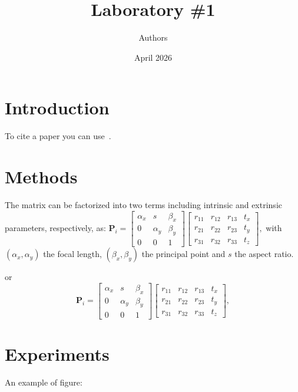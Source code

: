 \documentclass{article}
\title{Laboratory \#1}
\author{Authors}
\date{April 2026}
\begin{document}
\maketitle

\section{Introduction}

To cite a paper you can use~\cite{AgudoPAMI2022,YanICCV2015}.


\section{Methods}


The matrix can be factorized into two terms including intrinsic and extrinsic parameters, respectively, as:
$
\mathbf{P}_i=	\begin{bmatrix}
	\alpha_x & s & \beta_x\\
	0 & \alpha_y & \beta_y\\
	0&0&1
\end{bmatrix}
\begin{bmatrix}
	r_{11} & r_{12} & r_{13} & t_{x}\\
	r_{21} & r_{22} & r_{23} & t_{y}\\
	r_{31} & r_{32} & r_{33} & t_{z}
\end{bmatrix},
$
with $(\alpha_x,\alpha_y)$ the focal length, $(\beta_x,\beta_y)$ the principal point and $s$ the aspect ratio.

or
\begin{equation}
\mathbf{P}_i=	\begin{bmatrix}
	\alpha_x & s & \beta_x\\
	0 & \alpha_y & \beta_y\\
	0&0&1
\end{bmatrix}
\begin{bmatrix}
	r_{11} & r_{12} & r_{13} & t_{x}\\
	r_{21} & r_{22} & r_{23} & t_{y}\\
	r_{31} & r_{32} & r_{33} & t_{z}
\end{bmatrix},
\end{equation}

\newpage

\section{Experiments}

An example of figure:
\end{document}
